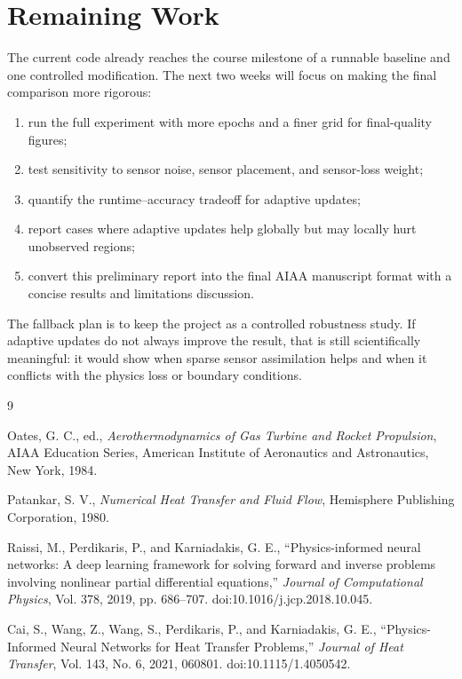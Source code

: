 \documentclass[journal]{new-aiaa}
\begin{document}
\section{Remaining Work}
The current code already reaches the course milestone of a runnable baseline and one controlled modification. The next two weeks will focus on making the final comparison more rigorous:
\begin{enumerate}
    \item run the full experiment with more epochs and a finer grid for final-quality figures;
    \item test sensitivity to sensor noise, sensor placement, and sensor-loss weight;
    \item quantify the runtime--accuracy tradeoff for adaptive updates;
    \item report cases where adaptive updates help globally but may locally hurt unobserved regions;
    \item convert this preliminary report into the final AIAA manuscript format with a concise results and limitations discussion.
\end{enumerate}

The fallback plan is to keep the project as a controlled robustness study. If adaptive updates do not always improve the result, that is still scientifically meaningful: it would show when sparse sensor assimilation helps and when it conflicts with the physics loss or boundary conditions.

\begin{thebibliography}{9}

Oates, G. C., ed., \textit{Aerothermodynamics of Gas Turbine and Rocket Propulsion}, AIAA Education Series, American Institute of Aeronautics and Astronautics, New York, 1984.

Patankar, S. V., \textit{Numerical Heat Transfer and Fluid Flow}, Hemisphere Publishing Corporation, 1980.

Raissi, M., Perdikaris, P., and Karniadakis, G. E., ``Physics-informed neural networks: A deep learning framework for solving forward and inverse problems involving nonlinear partial differential equations,'' \textit{Journal of Computational Physics}, Vol. 378, 2019, pp. 686--707. doi:10.1016/j.jcp.2018.10.045.

Cai, S., Wang, Z., Wang, S., Perdikaris, P., and Karniadakis, G. E., ``Physics-Informed Neural Networks for Heat Transfer Problems,'' \textit{Journal of Heat Transfer}, Vol. 143, No. 6, 2021, 060801. doi:10.1115/1.4050542.

\end{thebibliography}
\end{document}
